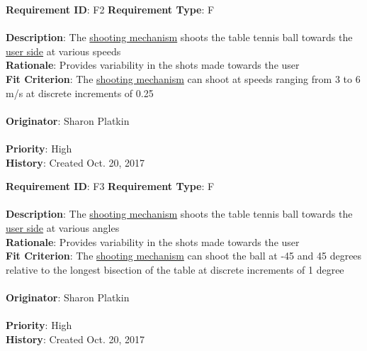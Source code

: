 \documentclass[11pt]{article}
\begin{document}
\begin{framed}
	\noindent\textbf{Requirement ID}: F2 \hfill \textbf{Requirement Type}: F \hfill\\\\
	\noindent\textbf{Description}: The \hyperref[sec:definitions]{shooting mechanism} shoots the table tennis ball towards the \hyperref[sec:definitions]{user side} at various speeds \\
	\textbf{Rationale}: Provides variability in the shots made towards the user \\
	\textbf{Fit Criterion}: The \hyperref[sec:definitions]{shooting mechanism} can shoot at speeds ranging from 3 to 6 m/s at discrete increments of 0.25 \\\\
	\textbf{Originator}: Sharon Platkin \\\\
	\textbf{Priority}: High \hfill \\
	\noindent\textbf{History}: Created Oct. 20, 2017
\end{framed}

\begin{framed}
	\noindent\textbf{Requirement ID}: F3 \hfill \textbf{Requirement Type}: F \hfill\\\\
	\noindent\textbf{Description}: The \hyperref[sec:definitions]{shooting mechanism} shoots the table tennis ball towards the \hyperref[sec:definitions]{user side} at various angles \\
	\textbf{Rationale}: Provides variability in the shots made towards the user \\
	\textbf{Fit Criterion}: The \hyperref[sec:definitions]{shooting mechanism} can shoot the ball at -45 and 45 degrees relative to the longest bisection of the table at discrete increments of 1 degree\\\\
	\textbf{Originator}: Sharon Platkin \\\\
	\textbf{Priority}: High \hfill \\
	\noindent\textbf{History}: Created Oct. 20, 2017
\end{framed}
\end{document}
